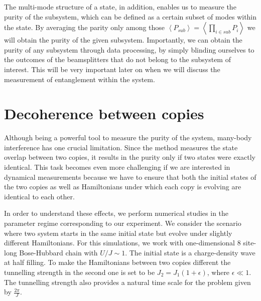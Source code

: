 The multi-mode structure of a state, in addition, enables us to measure the purity of the subsystem, which can be defined as a certain subset of modes within the state. By averaging the parity only among those $\left<P_{sub}\right> = \left< \prod_{i \in sub} P_i \right>$ we will obtain the purity of the given subsystem.  Importantly, we can obtain the purity of any subsystem through data processing, by simply blinding ourselves to the outcomes of the beamsplitters that do not belong to the subsystem of interest. This will be very important later on when we will discuss the measurement of entanglement within the system.

\section{Decoherence between copies}
Although being a powerful tool to measure the purity of the system, many-body interference has one crucial limitation. Since the method measures the state overlap between two copies, it results in the purity only if two states were exactly identical. This task becomes even more challenging if we are interested in dynamical measurements because we have to ensure that both the initial states of the two copies as well as Hamiltonians under which each copy is evolving are identical to each other.

In order to understand these effects, we perform numerical studies in the parameter regime corresponding to our experiment. We consider the scenario where two system starts in the same initial state but evolve under slightly different Hamiltonians. For this simulations, we work with one-dimensional $8$ site-long Bose-Hubbard chain with $U/J\sim1$. The initial state is a charge-density wave at half filling. To make the Hamiltonians between two copies different the tunnelling strength in the second one is set to be $J_2 = J_1(1+\epsilon)$, where $\epsilon \ll 1$. The tunnelling strength also provides a natural time scale for the problem given by $\frac{2 \pi}{J}$.

